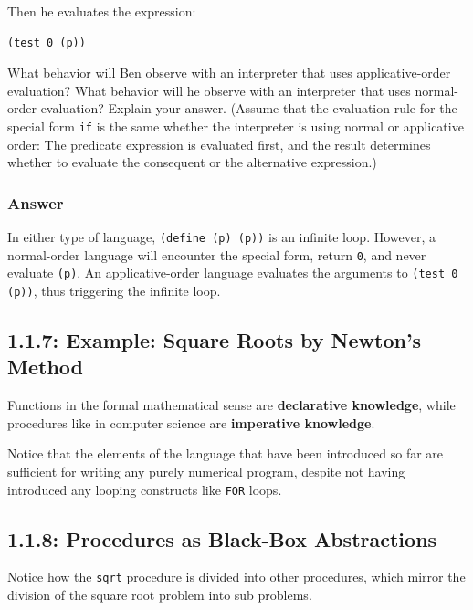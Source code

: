 \documentclass[final,fleqn,titlepage,twoside]{article}
\begin{document}
Then he evaluates the expression:

\begin{verbatim}
(test 0 (p))
\end{verbatim}

What behavior will Ben observe with an interpreter that uses applicative-order
evaluation?  What behavior will he observe with an interpreter that uses
normal-order evaluation?  Explain your answer.  (Assume that the evaluation
rule for the special form \texttt{if} is the same whether the interpreter is
using normal or applicative order: The predicate expression is evaluated first,
and the result determines whether to evaluate the consequent or the alternative
expression.)

\subsubsection{Answer}
\label{sec:org42f9f70}
In either type of language, \texttt{(define (p) (p))} is an infinite loop.
However, a normal-order language will encounter the special form, return
\texttt{0}, and never evaluate \texttt{(p)}. An applicative-order language
evaluates the arguments to \texttt{(test 0 (p))}, thus triggering the
infinite loop.

\subsection{1.1.7: Example: Square Roots by Newton's Method}
\label{sec:org5847173}
Functions in the formal mathematical sense are \textbf{declarative knowledge}, while
procedures like in computer science are \textbf{imperative knowledge}.

Notice that the elements of the language that have been introduced so far are
sufficient for writing any purely numerical program, despite not having
introduced any looping constructs like \texttt{FOR} loops.

\subsection{1.1.8: Procedures as Black-Box Abstractions}
\label{sec:orgb93f5fa}
Notice how the \texttt{sqrt} procedure is divided into other procedures,
which mirror the division of the square root problem into sub problems.
\end{document}
